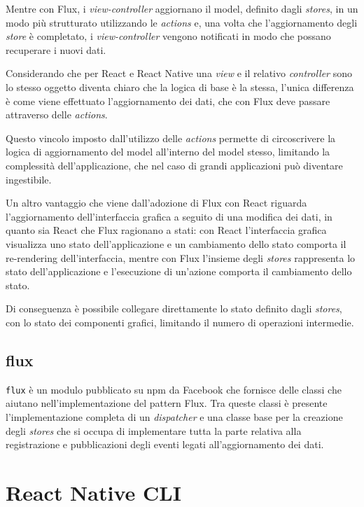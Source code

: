 Mentre con Flux, i \textit{view-controller} aggiornano il model, definito dagli \textit{stores}, in un modo più strutturato utilizzando le \textit{actions} e, una volta che l'aggiornamento degli \textit{store} è completato, i \textit{view-controller} vengono notificati in modo che possano recuperare i nuovi dati.

Considerando che per React e React Native una \textit{view} e il relativo \textit{controller} sono lo stesso oggetto diventa chiaro che la logica di base è la stessa, l'unica differenza è come viene effettuato l'aggiornamento dei dati, che con Flux deve passare attraverso delle \textit{actions}.

Questo vincolo imposto dall'utilizzo delle \textit{actions} permette di circoscrivere la logica di aggiornamento del model all'interno del model stesso, limitando la complessità dell'applicazione, che nel caso di grandi applicazioni può diventare ingestibile.

Un altro vantaggio che viene dall'adozione di Flux con React riguarda l'aggiornamento dell'interfaccia grafica a seguito di una modifica dei dati, in quanto sia React che Flux ragionano a stati: con React l'interfaccia grafica visualizza uno stato dell'applicazione e un cambiamento dello stato comporta il re-rendering dell'interfaccia, mentre con Flux l'insieme degli \textit{stores} rappresenta lo stato dell'applicazione e l'esecuzione di un'azione comporta il cambiamento dello stato.

Di conseguenza è possibile collegare direttamente lo stato definito dagli \textit{stores}, con lo stato dei componenti grafici, limitando il numero di operazioni intermedie.

\subsection{flux}\label{sec:flux-npm}

\texttt{flux} è un modulo pubblicato su npm da Facebook che fornisce delle classi che aiutano nell'implementazione del pattern Flux.
Tra queste classi è presente l'implementazione completa di un \textit{dispatcher} e una classe base per la creazione degli \textit{stores} che si occupa di implementare tutta la parte relativa alla registrazione e pubblicazioni degli eventi legati all'aggiornamento dei dati.

\section{React Native CLI}\label{sec:packager}

